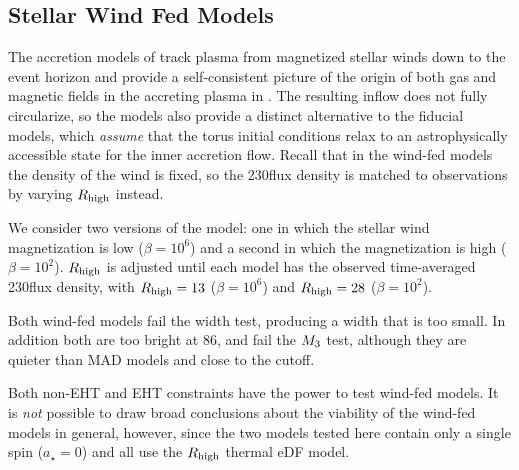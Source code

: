 \subsection{Stellar Wind Fed Models}

The accretion models of \cite{2020ApJ...896L...6R, 2020MNRAS.492.3272R, 2018MNRAS.478.3544R} track plasma from  magnetized stellar winds down to the event horizon and provide a self-consistent picture of the origin of both gas and magnetic fields in the accreting plasma in \sgra.
The resulting inflow does not fully circularize, so the models also provide a distinct alternative to the fiducial models, which {\em assume} that the torus initial conditions relax to an astrophysically accessible state for the inner accretion flow.
Recall that in the wind-fed models the density of the wind is fixed, so the 230\GHz flux density is matched to observations by varying $R_\mathrm{high}$ instead.

We consider two versions of the model: one in which the stellar wind magnetization is low ($\beta = 10^6$) and a second in which the magnetization is high ($\beta = 10^2$).
$R_\mathrm{high}$ is adjusted until each model has the observed time-averaged 230\GHz flux density, with $R_\mathrm{high} = 13$ ($\beta = 10^6$) and $R_\mathrm{high} = 28$ ($\beta = 10^2$).

Both wind-fed models fail the \mring width test, producing a width that is too small.
In addition both are too bright at 86\GHz, and fail the $M_{3}$ test, although they are quieter than MAD models and close to the cutoff.

Both non-EHT and EHT constraints have the power to test wind-fed models.
It is {\em not} possible to draw broad conclusions about the viability of the wind-fed models in general, however, since the two models tested here contain only a single spin ($a_\star=0$) and all use the $R_\mathrm{high}$ thermal eDF model.
